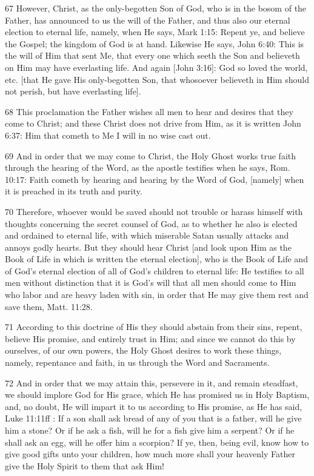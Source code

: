 {67 However, Christ, as the only-begotten Son of God, who is in the bosom of the Father, has announced to us the will of the Father, and thus also our eternal election to eternal life, namely, when He says, Mark 1:15: Repent ye, and believe the Gospel; the kingdom of God is at hand. Likewise He says, John 6:40: This is the will of Him that sent Me, that every one which seeth the Son and believeth on Him may have everlasting life. And again [John 3:16]: God so loved the world, etc. [that He gave His only-begotten Son, that whosoever believeth in Him should not perish, but have everlasting life].

68 This proclamation the Father wishes all men to hear and desires that they come to Christ; and these Christ does not drive from Him, as it is written John 6:37: Him that cometh to Me I will in no wise cast out.

69 And in order that we may come to Christ, the Holy Ghost works true faith through the hearing of the Word, as the apostle testifies when he says, Rom. 10:17: Faith cometh by hearing and hearing by the Word of God, [namely] when it is preached in its truth and purity.

70 Therefore, whoever would be saved should not trouble or harass himself with thoughts concerning the secret counsel of God, as to whether he also is elected and ordained to eternal life, with which miserable Satan usually attacks and annoys godly hearts. But they should hear Christ [and look upon Him as the Book of Life in which is written the eternal election], who is the Book of Life and of God’s eternal election of all of God’s children to eternal life: He testifies to all men without distinction that it is God’s will that all men should come to Him who labor and are heavy laden with sin, in order that He may give them rest and save them, Matt. 11:28.

71 According to this doctrine of His they should abstain from their sins, repent, believe His promise, and entirely trust in Him; and since we cannot do this by ourselves, of our own powers, the Holy Ghost desires to work these things, namely, repentance and faith, in us through the Word and Sacraments.

72 And in order that we may attain this, persevere in it, and remain steadfast, we should implore God for His grace, which He has promised us in Holy Baptism, and, no doubt, He will impart it to us according to His promise, as He has said, Luke 11:11ff : If a son shall ask bread of any of you that is a father, will he give him a stone? Or if he ask a fish, will he for a fish give him a serpent? Or if he shall ask an egg, will he offer him a scorpion? If ye, then, being evil, know how to give good gifts unto your children, how much more shall your heavenly Father give the Holy Spirit to them that ask Him!

}
